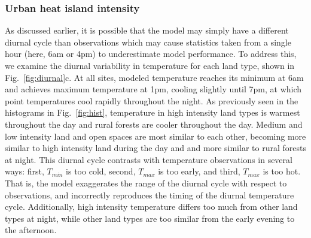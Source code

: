 \subsubsection{Urban heat island intensity}
As discussed earlier, it is possible that the model may simply have a different diurnal cycle than observations which may cause statistics taken from a single hour (here, 6am or 4pm) to underestimate model performance. To address this, we examine the diurnal variability in temperature for each land type, shown in Fig.~\ref{fig:diurnal}c. At all sites, modeled temperature reaches its minimum at 6am and achieves maximum temperature at 1pm, cooling slightly until  7pm, at which point temperatures cool rapidly throughout the night. As previously seen in the histograms in Fig.~\ref{fig:hist}, 
temperature in high intensity land types is warmest throughout the day and rural forests are cooler throughout the day. Medium and low intensity land and open spaces are most similar to each other, becoming more similar to high intensity land during the day and and more similar to rural forests at night. 
This diurnal cycle contrasts with temperature observations in several ways: first, $T_{min}$ is too cold, second, $T_{max}$ is too early, and third, $T_{max}$ is too hot. That is, the model exaggerates the range of the diurnal cycle with respect to observations, and incorrectly reproduces the timing of the diurnal temperature cycle. Additionally, high intensity temperature differs too much from other land types at night, while other land types are too similar from the early evening to the afternoon. 
 
